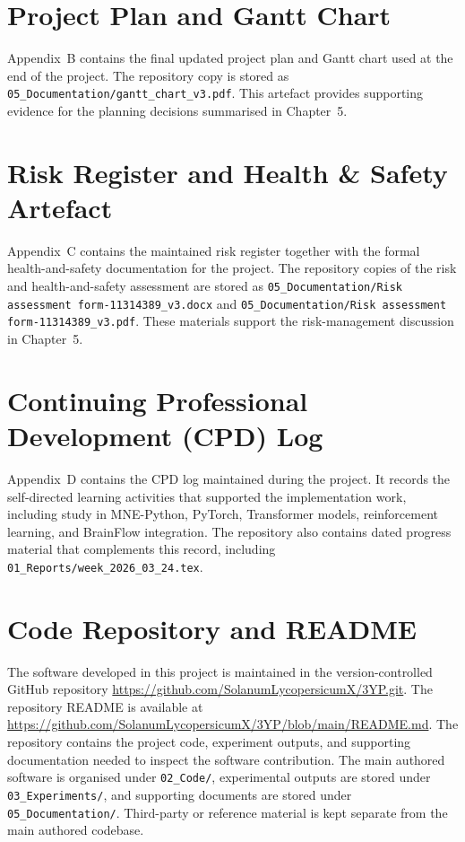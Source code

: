 \documentclass[12pt, a4paper]{article}
\begin{document}


\section{Project Plan and Gantt Chart}

Appendix~B contains the final updated project plan and Gantt chart used at the end of the project. The repository copy is stored as \texttt{05\_Documentation/gantt\_chart\_v3.pdf}. This artefact provides supporting evidence for the planning decisions summarised in Chapter~5.



\section{Risk Register and Health \& Safety Artefact}

Appendix~C contains the maintained risk register together with the formal health-and-safety documentation for the project. The repository copies of the risk and health-and-safety assessment are stored as \texttt{05\_Documentation/Risk assessment form-11314389\_v3.docx} and \texttt{05\_Documentation/Risk assessment form-11314389\_v3.pdf}. These materials support the risk-management discussion in Chapter~5.



\section{Continuing Professional Development (CPD) Log}

Appendix~D contains the CPD log maintained during the project. It records the self-directed learning activities that supported the implementation work, including study in MNE-Python, PyTorch, Transformer models, reinforcement learning, and BrainFlow integration. The repository also contains dated progress material that complements this record, including \texttt{01\_Reports/week\_2026\_03\_24.tex}.



\section{Code Repository and README}

The software developed in this project is maintained in the version-controlled GitHub repository \url{https://github.com/SolanumLycopersicumX/3YP.git}. The repository README is available at \url{https://github.com/SolanumLycopersicumX/3YP/blob/main/README.md}. The repository contains the project code, experiment outputs, and supporting documentation needed to inspect the software contribution. The main authored software is organised under \texttt{02\_Code/}, experimental outputs are stored under \texttt{03\_Experiments/}, and supporting documents are stored under \texttt{05\_Documentation/}. Third-party or reference material is kept separate from the main authored codebase.
\end{document}
